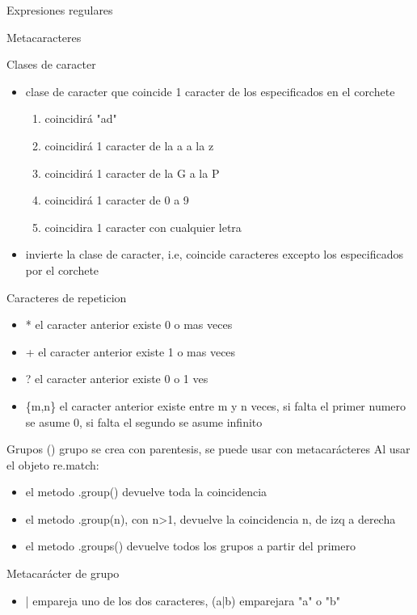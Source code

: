 \documentclass[presentation]{beamer}
\begin{document}
\begin{frame}[label={sec:orgefa8e4e}]{Expresiones regulares}
\begin{block}{Metacaracteres}
\begin{block}{Clases de caracter}
\begin{itemize}
\item\relax [abc]    clase de caracter que coincide 1 caracter de los especificados en el corchete
\begin{enumerate}
\item\relax [abc][def] coincidirá "ad"
\item\relax [a-z]      coincidirá 1 caracter de la a a la z
\item\relax [G-P]      coincidirá 1 caracter de la G a la P
\item\relax [0-9]      coincidirá 1 caracter de 0 a 9
\item\relax [A-Za-z]   coincidira 1 caracter con cualquier letra
\end{enumerate}

\item\relax [\^{}]   invierte la clase de caracter, i.e, coincide caracteres excepto los especificados por el corchete
\end{itemize}
\end{block}

\begin{block}{Caracteres de repeticion}
\begin{itemize}
\item *     el caracter anterior existe 0 o mas veces
\item +     el caracter anterior existe 1 o mas veces
\item ?     el caracter anterior existe 0 o 1 ves
\item \{m,n\} el caracter anterior existe entre m y n veces, si falta el primer numero se asume 0, si falta el segundo se asume infinito
\end{itemize}
\end{block}

\begin{block}{Grupos}
()    grupo se crea con parentesis, se puede usar con metacarácteres
Al usar el objeto re.match:
\begin{itemize}
\item el metodo .group() devuelve toda la coincidencia
\item el metodo .group(n), con n>1, devuelve la coincidencia n, de izq a derecha
\item el metodo .groups() devuelve todos los grupos a partir del primero
\end{itemize}

Metacarácter de grupo
\begin{itemize}
\item | empareja uno de los dos caracteres, (a|b) emparejara "a" o "b"
\end{itemize}


\end{block}
\end{block}
\end{frame}
\end{document}
